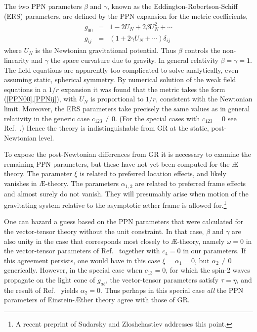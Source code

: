 \documentclass[aps]{ws-procs9x6}
\def\bea{\begin{eqnarray}}
\def\eea{\end{eqnarray}}
\def\a{\alpha}
\def\b{\beta}
\def\g{\gamma}
\def\d{\delta}
\def\t{\tau}
\begin{document}
The two PPN parameters $\beta$ and $\gamma$, known as the
Eddington-Robertson-Schiff (ERS) parameters,
are defined by the PPN expansion for the metric coefficients,
%
\bea
g_{00}&=&1-2U_N +2\b U_N^2+\cdots\label{PPN00}\\
g_{ij}&=&(1+2\g U_N +\cdots)\d_{ij}
\label{PPNij}
\eea
%
where $U_N$ is the Newtonian gravitational potential.
Thus $\beta$ controls the non-linearity and $\gamma$ the space
curvature due to gravity. In general relativity
$\b=\g=1$.
The field equations are apparently too complicated to
solve analytically, even assuming static, spherical
symmetry.
By numerical solution of the weak field equations in a
$1/r$ expansion it was found\cite{ElingJ1} that the metric takes
the form (\ref{PPN00},\ref{PPNij}), with $U_N$ is proportional
to $1/r$, consistent with the Newtonian limit.
Moreover, the ERS parameters take precisely the same values
as in general relativity in the generic case $c_{123}\ne0$.
(For the special cases with $c_{123}=0$ see Ref.~.)
Hence the theory is indistinguishable from GR at the
static, post-Newtonian level.

To expose the post-Newtonian differences from GR it is necessary
to examine the remaining PPN parameters, but these have not yet
been computed for the {\AE}-theory. The parameter $\xi$ is related
to preferred location effects, and likely vanishes in
{\AE}-theory. The parameters $\a_{1,2}$ are related to preferred
frame effects and almost surely do not vanish. They will
presumably arise when motion of the gravitating system relative to
the asymptotic {\ae}ther frame is allowed for.\footnote{A recent
preprint of Sudarsky and Zloshchastiev\cite{SZ} addresses this
point.}

One can hazard a guess based on the PPN parameters that were
calculated for the vector-tensor theory without the unit
constraint.\cite{WillBook} In that case, $\beta$ and $\gamma$ are
also unity in the case that corresponds most closely to
\AE-theory, namely $\omega=0$ in the vector-tensor parameters of
Ref.~ together with $c_4=0$ in our
parameters\cite{ElingJ1}. If this agreement persists, one would
have in this case $\xi=\a_1=0$, but $\a_2\ne0$ generically.
However, in the special case when $c_{13}=0$, for which the
spin-2 waves propagate on the light cone of $g_{ab}$, the
vector-tensor parameters satisfy $\t=\eta$, and the result of
Ref.~ yields $\a_2=0$. Thus perhaps in this
special case {\it all} the PPN parameters of Einstein-{\AE}ther
theory agree with those of GR.
\end{document}
